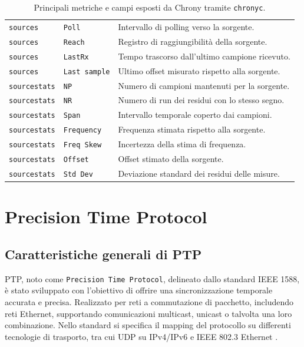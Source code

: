 \begin{table}[H]
\begin{tabularx}{\textwidth}{p{} p{} Y}
    \texttt{sources} & \texttt{Poll} & Intervallo di polling verso la sorgente. \\
    \texttt{sources} & \texttt{Reach} & Registro di raggiungibilità della sorgente. \\
    \texttt{sources} & \texttt{LastRx} & Tempo trascorso dall'ultimo campione ricevuto. \\
    \texttt{sources} & \texttt{Last sample} & Ultimo offset misurato rispetto alla sorgente. \\
    \midrule
    \texttt{sourcestats} & \texttt{NP} & Numero di campioni mantenuti per la sorgente. \\
    \texttt{sourcestats} & \texttt{NR} & Numero di run dei residui con lo stesso segno. \\
    \texttt{sourcestats} & \texttt{Span} & Intervallo temporale coperto dai campioni. \\
    \texttt{sourcestats} & \texttt{Frequency} & Frequenza stimata rispetto alla sorgente. \\
    \texttt{sourcestats} & \texttt{Freq Skew} & Incertezza della stima di frequenza. \\
    \texttt{sourcestats} & \texttt{Offset} & Offset stimato della sorgente. \\
    \texttt{sourcestats} & \texttt{Std Dev} & Deviazione standard dei residui delle misure. \\
    \bottomrule
  \end{tabularx}
  \caption{Principali metriche e campi esposti da Chrony tramite \texttt{chronyc}.}
  \label{tab:chrony_metriche}
\end{table}

\section{Precision Time Protocol}
\subsection{Caratteristiche generali di PTP}

\begin{sloppypar}
PTP, noto come \texttt{Precision Time Protocol}, delineato dallo standard IEEE 1588, 
è stato sviluppato con l'obiettivo di offrire una sincronizzazione temporale accurata e precisa.
Realizzato per reti a commutazione di pacchetto, includendo reti Ethernet, supportando 
comunicazioni multicast, unicast o talvolta una loro combinazione.
Nello standard si specifica il mapping del protocollo su differenti tecnologie di trasporto, tra cui UDP su IPv4/IPv6 e
IEEE 802.3 Ethernet \cite{IEEEStandardPrecision2020}.
\end{sloppypar}

